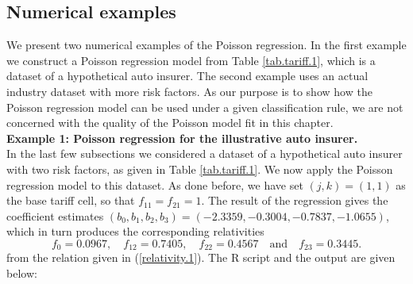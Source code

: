 \documentclass[12pt]{article}
\begin{document}
\subsection{Numerical examples}
We present two numerical examples of the Poisson regression. In the first example we construct a Poisson regression model from Table \ref{tab.tariff.1}, which is a dataset of a hypothetical auto insurer. The second example uses an actual industry dataset with more risk factors. As our purpose is to show how the Poisson regression model can be used under a given classification rule, we are not concerned with the quality of the Poisson model fit  in this chapter. \\

\noindent\textbf{Example 1: Poisson regression for the illustrative auto insurer.}\\
In the last few subsections we considered a dataset of a hypothetical auto insurer with two risk factors, as given in  Table \ref{tab.tariff.1}. We now apply the Poisson regression model to this dataset. As done before, we have set $(j,k)=(1,1)$ as the base tariff cell, so that  $f_{11}=f_{21}=1$. The result of the regression gives the coefficient estimates $(b_0, b_1,b_2,b_3)=(-2.3359,      -0.3004,      -0.7837,      -1.0655 )$, which in turn produces the corresponding relativities
\begin{equation}
\label{relativity.eg1} \nonumber
{f}_0=0.0967, \quad {f}_{12}=  0.7405, \quad {f}_{22}=0.4567 \quad \text{and}\quad {f}_{23}=0.3445.
\end{equation} from the relation given in (\ref{relativity.1}). The R script and the output are given below:
\end{document}
